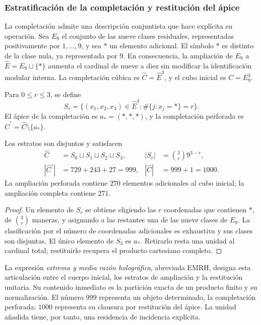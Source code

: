 \subsubsection{Estratificación de la completación y restitución del ápice}
\label{sec:revision-emrh}

La completación admite una descripción conjuntista que hace explícita su
operación. Sea \(E_9\) el conjunto de las nueve clases residuales, representadas
positivamente por \(1,\ldots,9\), y sea \(\ast\) un elemento adicional.
El símbolo \(\ast\) es distinto de la clase nula, ya representada por \(9\).
En consecuencia, la ampliación de \(E_9\) a
\(\widehat E=E_9\sqcup\{\ast\}\) aumenta el cardinal de nueve a diez
sin modificar la identificación modular interna. La completación cúbica es
\(\widehat C=\widehat E^3\), y el cubo inicial es \(C=E_9^3\).

\begin{definition}
Para \(0\leq r\leq3\), se define
\[
 S_r=\{(x_1,x_2,x_3)\in\widehat E^3:
             \#\{j:x_j=\ast\}=r\}.
\]
El ápice de la completación es \(a_\ast=(\ast,\ast,\ast)\), y la
completación perforada es \(\widehat C^{\circ}=\widehat C\setminus\{a_\ast\}\).
\end{definition}

\begin{proposition}
Los estratos son disjuntos y satisfacen
\begin{align}
 \widehat C&=S_0\sqcup S_1\sqcup S_2\sqcup S_3,
 &|S_r|&=\binom3r9^{3-r},\label{eq:revision-estratos}\\
 |\widehat C^{\circ}|&=729+243+27=999,
 &|\widehat C|&=999+1=1000.\label{eq:revision-999}
\end{align}
La ampliación perforada contiene \(270\) elementos adicionales al cubo
inicial; la ampliación completa contiene \(271\).
\end{proposition}
\begin{proof}
Un elemento de \(S_r\) se obtiene eligiendo las \(r\) coordenadas que
contienen \(\ast\), de \(\binom3r\) maneras, y asignando a las restantes
una de las nueve clases de \(E_9\). La clasificación por el número de
coordenadas adicionales es exhaustiva y sus clases son disjuntas. El único
elemento de \(S_3\) es \(a_\ast\). Retirarlo resta una unidad al cardinal
total; restituirlo recupera el producto cartesiano completo.
\end{proof}

La expresión \emph{extrema y media razón holográfica}, abreviada EMRH,
designa esta articulación entre el cuerpo inicial, los
estratos de ampliación y la restitución unitaria. Su contenido inmediato
es la partición exacta de un producto finito y su normalización. El número
\(999\) representa un objeto determinado, la completación perforada;
\(1000\) representa su clausura por restitución del ápice. La unidad
añadida tiene, por tanto, una residencia de incidencia explícita.

